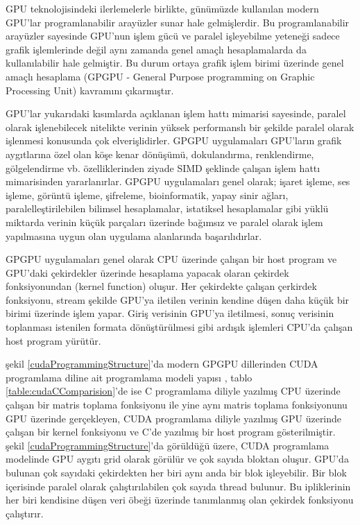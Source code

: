 GPU teknolojisindeki ilerlemelerle birlikte, günümüzde kullanılan modern GPU’lar programlanabilir arayüzler sunar hale gelmişlerdir. Bu programlanabilir arayüzler sayesinde GPU’nun işlem gücü ve paralel işleyebilme yeteneği sadece grafik işlemlerinde değil aynı zamanda genel amaçlı hesaplamalarda da kullanılabilir hale gelmiştir. Bu durum ortaya grafik işlem birimi üzerinde genel amaçlı hesaplama (GPGPU - General Purpose programming on Graphic Processing Unit) kavramını çıkarmıştır. \par
GPU’lar yukarıdaki kısımlarda açıklanan işlem hattı mimarisi sayesinde, paralel olarak işlenebilecek nitelikte verinin yüksek performanslı bir şekilde paralel olarak işlenmesi konusunda çok elverişlidirler. GPGPU uygulamaları GPU’ların grafik aygıtlarına özel olan köşe kenar dönüşümü, dokulandırma, renklendirme, gölgelendirme vb. özelliklerinden ziyade SIMD şeklinde çalışan işlem hattı mimarisinden yararlanırlar. GPGPU uygulamaları genel olarak; işaret işleme, ses işleme, görüntü işleme, şifreleme, bioinformatik, yapay sinir ağları, paralelleştirilebilen bilimsel hesaplamalar, istatiksel hesaplamalar gibi yüklü miktarda verinin küçük parçaları üzerinde bağımsız ve paralel olarak işlem yapılmasına uygun olan uygulama alanlarında başarılıdırlar.\par

GPGPU uygulamaları genel olarak CPU üzerinde çalışan bir host program ve GPU’daki çekirdekler üzerinde hesaplama yapacak olaran çekirdek fonksiyonundan (kernel function) oluşur. Her çekirdekte çalışan çerkirdek fonksiyonu, stream şekilde GPU’ya iletilen verinin kendine düşen daha küçük bir birimi üzerinde işlem yapar. Giriş verisinin GPU’ya iletilmesi, sonuç verisinin toplanması istenilen formata dönüştürülmesi gibi ardışık işlemleri CPU’da çalışan host program yürütür. \par
şekil \ref{cudaProgrammingStructure}’da modern GPGPU dillerinden CUDA programlama diline ait programlama modeli yapısı \cite{cudaProgrammingStructure},  tablo \ref{table:cudaCComparision}’de ise C programlama diliyle yazılmış CPU üzerinde çalışan bir matris toplama fonksiyonu ile yine aynı matris toplama fonksiyonunu GPU üzerinde gerçekleyen, CUDA programlama diliyle yazılmış GPU üzerinde çalışan bir kernel fonksiyonu ve C’de yazılmış bir host program gösterilmiştir. şekil \ref{cudaProgrammingStructure}’da görüldüğü üzere, CUDA programlama modelinde GPU aygıtı grid olarak görülür ve çok sayıda bloktan oluşur. GPU’da bulunan çok sayıdaki çekirdekten her biri aynı anda bir blok işleyebilir. Bir blok içerisinde paralel olarak çalıştırılabilen çok sayıda thread bulunur. Bu ipliklerinin her biri kendisine düşen veri öbeği üzerinde tanımlanmış olan çekirdek fonksiyonu çalıştırır.

